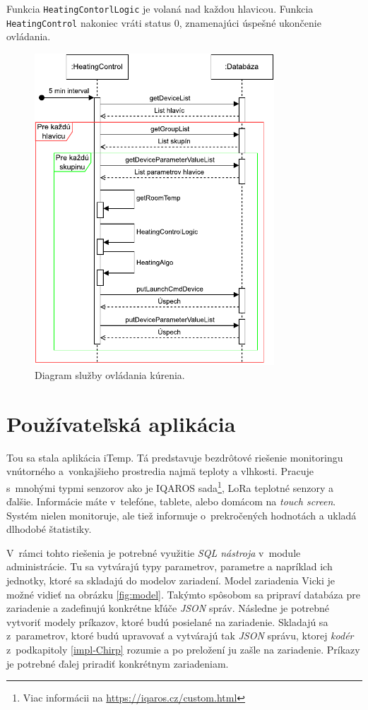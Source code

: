  Funkcia \texttt{HeatingContorlLogic} je volaná nad každou hlavicou.
 Funkcia \texttt{HeatingControl} nakoniec vráti status 0, znamenajúci úspešné ukončenie ovládania.

\begin{figure}[H]
    \centering
    \includegraphics[width=0.8\textwidth]{obrazky-figures/diagram.pdf}
    \caption{Diagram služby ovládania kúrenia.}
    \label{fig:diagram}
\end{figure}

\section{Používateľská aplikácia}\label{impl-iTemp}
Tou sa stala aplikácia iTemp.
Tá predstavuje bezdrôtové riešenie monitoringu vnútorného a~vonkajšieho prostredia najmä teploty a vlhkosti.
Pracuje s~mnohými typmi senzorov ako je IQAROS sada\footnote{Viac informácii na \url{https://iqaros.cz/custom.html}}, LoRa teplotné senzory a ďalšie. 
Informácie máte v~telefóne, tablete, alebo domácom na \emph{touch screen}. Systém nielen monitoruje, ale tiež informuje o~prekročených hodnotách a ukladá dlhodobé štatistiky.

V~rámci tohto riešenia je potrebné využitie \emph{SQL nástroja}  v~module administrácie. 
Tu sa vytvárajú typy parametrov, parametre a napríklad ich jednotky, ktoré sa skladajú do modelov zariadení. Model zariadenia Vicki je možné vidieť na obrázku \ref{fig:model}.
Takýmto spôsobom sa pripraví databáza pre zariadenie a zadefinujú konkrétne kľúče \emph{JSON} správ. 
Následne je potrebné vytvoriť modely príkazov, ktoré budú posielané na zariadenie. 
Skladajú sa z~parametrov, ktoré budú upravovať a vytvárajú tak \emph{JSON} správu, ktorej \emph{kodér} z~podkapitoly \ref{impl-Chirp} rozumie a po preložení ju zašle na zariadenie. 
Príkazy je potrebné ďalej priradiť konkrétnym zariadeniam.

